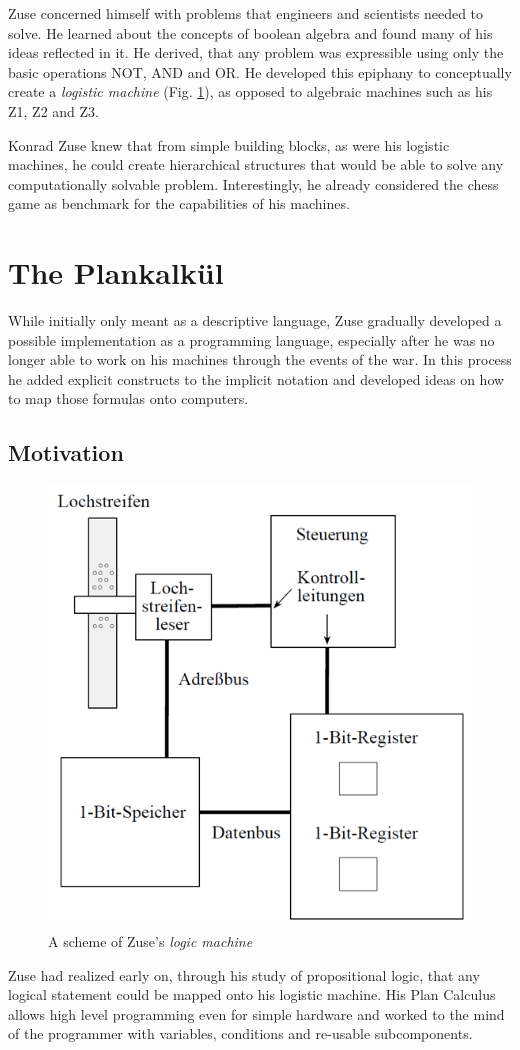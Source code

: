 \documentclass{llncs}
\begin{document}
   Zuse concerned himself with problems that engineers and scientists needed to 
   solve. He learned about the concepts of boolean algebra and found many 
   of his ideas reflected in it. He derived, that any problem was expressible
   using only the basic operations NOT, AND and OR. He developed this epiphany 
   to conceptually create a \emph{logistic machine} (Fig. \ref{fig:logicmachine}), 
   as opposed to algebraic machines such as his Z1, Z2 and Z3\cite{epegmagHorstzuse}.
   
   Konrad Zuse knew
   that from simple building blocks, as were his logistic machines, 
   he could create hierarchical structures that would be able to solve any 
   computationally solvable problem. Interestingly, he already considered the chess game as
   benchmark for the capabilities of his machines\cite{rojas2002konrad}.
 \section{The Plankalkül}
   While initially only meant as a descriptive language, Zuse gradually 
   developed a possible implementation as a programming language, especially 
   after he was no longer able to work on his machines through the events of the war\cite{giloi2002konrad}.
   In this process he added explicit constructs to the implicit notation and developed ideas 
   on how to map those formulas onto computers\cite{rojas2002konrad}.
 \subsection{Motivation}
  \begin{figure}[bt]
    \centering
    \includegraphics[width=0.4\linewidth]{img/logicmachine.png}
    \caption{A scheme of Zuse's \emph{logic machine}\cite{rojas2002plankalkuel}}
    \label{fig:logicmachine}
  \end{figure}

   Zuse had realized early on, through his study of propositional logic, that any 
   logical statement could be mapped onto his logistic machine. His Plan Calculus
   allows high level programming even for simple hardware and worked to the mind 
   of the programmer with variables, conditions and re-usable subcomponents\cite{giloi2002konrad}.
\end{document}
